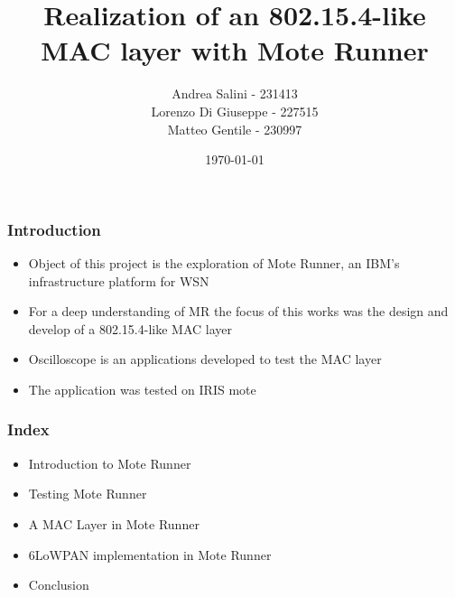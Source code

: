 \documentclass[12pt, compress]{beamer}
\title{Realization of an 802.15.4-like MAC layer with Mote Runner}
\subtitle{}
\date{\today}
\author{Andrea Salini - 231413 \\ Lorenzo Di Giuseppe - 227515 \\ Matteo Gentile - 230997}
\institute{DISIM - Università degli Studi dell’Aquila}
\begin{document}
  \maketitle
  
\begin{frame}[fragile]
  \frametitle{Introduction}
  \begin{itemize}
    \item Object of this project is the exploration of Mote Runner, an IBM’s infrastructure platform for WSN
    \item For a deep understanding of MR the focus of this works was the design and develop of a 802.15.4-like MAC layer
    \item Oscilloscope is an applications developed to test the MAC layer
    \item The application was tested on IRIS mote
  \end{itemize}
\end{frame}

\begin{frame}[fragile]
  \frametitle{Index}
  \begin{itemize}
    \item Introduction to Mote Runner
    \item Testing Mote Runner
    \item A MAC Layer in Mote Runner
    \item 6LoWPAN implementation in Mote Runner
    \item Conclusion
  \end{itemize}
\end{frame}







%
\end{document}
